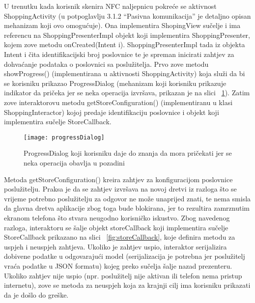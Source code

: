 U trenutku kada korisnik skenira NFC naljepnicu pokre\'{c}e se aktivnost ShoppingActivity (u potpoglavlju 3.1.2 ``Pasivna komunikacija'' je detaljno opisan mehanizam koji ovo omogu\'{c}uje). Ona implementira ShopingView su\v{c}elje i ima referencu na ShoppingPresenterImpl objekt koji implementira ShoppingPresenter, kojem zove metodu onCreated(Intent i). ShoppingPresenterImpl tada iz objekta Intent i \v{c}ita identifikacijski broj poslovnice te je spreman inicirati zahtjev za dohva\'{c}anje podataka o poslovnici sa poslu\v{z}itelja. Prvo zove metodu showProgress() (implementirana u aktivnosti ShoppingActivity) koja slu\v{z}i da bi se korisniku prikazao ProgressDialog (mehanizam koji korisniku prikazuje indikator da pri\v{c}eka jer se neka operacija izvr\v{s}ava, prikazan je na slici ~\ref{fig:progressDialog}). Zatim zove interaktorovu metodu getStoreConfiguration() (implementiranu u klasi ShoppingInteractor) kojoj predaje identifikaciju poslovnice i objekt koji implementira su\v{c}elje StoreCallback.


\begin{figure}[!htbp]
	\begin{center}
 \texttt{[image: progressDialog]}
 \caption{ProgressDialog koji korisniku daje do znanja da mora pri\v{c}ekati jer se neka operacija obavlja u pozadini}
 \label{fig:progressDialog}
	\end{center}
\end{figure}

Metoda getStoreConfiguration() kreira zahtjev za konfiguracijom poslovnice poslu\v{z}itelju. Praksa je da se zahtjev izvr\v{s}ava na novoj dretvi iz razloga \v{s}to se vrijeme potrebno poslu\v{z}itelju za odgovor ne mo\v{z}e unaprijed znati, te nema smisla da glavna dretva aplikacije zbog toga bude blokirana, jer to rezultira zamrznutim ekranom telefona \v{s}to stvara neugodno korisni\v{c}ko iskustvo. Zbog navedenog razloga, interaktoru se \v{s}alje objekt storeCallback koji implementira su\v{c}elje StoreCallback prikazano na slici ~\ref{fig:storeCallback}, koje definira metodu za uspjeh i neuspjeh zahtjeva. Ukoliko je zahtjev uspio, interaktor serijalizira dobivene podatke u odgovaraju\'{c}i model (serijalizacija je potrebna jer poslu\v{z}itelj vra\'{c}a podatke u JSON formatu) kojeg preko su\v{c}elja \v{s}alje nazad prezenteru. Ukoliko zahtjev nije uspio (npr. poslu\v{z}itelj nije aktivan ili telefon nema pristup internetu), zove se metoda za neuspjeh koja za krajnji cilj ima korisniku prikazati da je do\v{s}lo do gre\v{s}ke.


